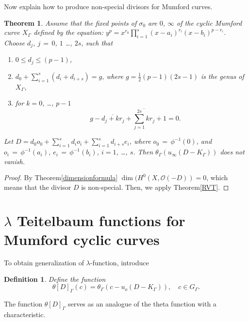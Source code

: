 \documentclass[]{amsart}
\numberwithin{equation}{section}
\newtheorem{theorem}{Theorem}[section]
\newtheorem{definition}{Definition}[section]
\begin{document}
 Now explain how to produce non-special divisors for Mumford curves. 
 \begin{theorem}\label{ThetaNV}
 Assume that the fixed points of $\sigma_0$ are $0$, $\infty$ of the cyclic Mumford curve $X_{\Gamma}$
 defined by  the equation: $y^p=x^{r_0}\prod_{i=1}^s (x-a_i)^{r_i}(x-b_i)^{p-r_i}$. 
 Choose $d_j$, $j\,{=}\,0$, $1$ \ldots, $2s$,  
 such that 
  \begin{enumerate}
\item $0\leq d_j \leq (p-1)$,
 \item $d_0 +\sum_{i=1}^s (d_i + d_{i+s})=g$, where  $g=\frac{1}{2} (p-1)(2s-1)$ is the genus of $X_{\Gamma}$,
 \item for  $k=0$, \ldots, $p-1$
\begin{equation}
\quad g-\overline{d_j+kr_j}+\overline{\sum_{j=1}^{2s} kr_j}+1=0.
\end{equation}
 \end{enumerate}
 Let $D=d_0 o_0 +\sum_{i=1}^s d_i o_i+\sum_{i=1}^s d_{i+s} e_i$, where 
 $o_0\,{=}\,\phi^{-1}(0)$, and $o_i \,{=}\, \phi^{-1}(a_i)$, $e_i \,{=}\, \phi^{-1}(b_i)$, $i=1$, \ldots, $s$.
 Then $\theta_{\Gamma}(u_{\infty}(D-K_{\Gamma}))$ does not vanish.
 \end{theorem}
 \begin{proof}
 By Theorem\;\ref{dimensionformula}  $\dim(H^0(X,\mathcal{O}(-D))=0$, which means that 
 the divisor $D$ is non-special. Then, we apply Theorem\;\ref{RVT}. 
 \end{proof}
 \section{$\lambda$ Teitelbaum functions for Mumford cyclic curves}
 To obtain generalization of  $\lambda$-function, introduce
 \begin{definition}
 Define the function 
 \begin{equation}
 \theta[D]_{\Gamma}(c) = \theta_{\Gamma}(c-u_o(D-K_{\Gamma})),\quad c\in G_{\Gamma}.  
 \end{equation} 
 \end{definition}{ The function $ \theta[D]_{\Gamma}$ serves as an analogue
 of the theta function with a characteristic. }
 
\end{document}
